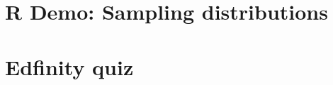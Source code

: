 \documentclass[t,compress,mathserif]{beamer}
\begin{document}
\section{R Demo: Sampling distributions}



\section{Edfinity quiz}




 


    
\end{document}
